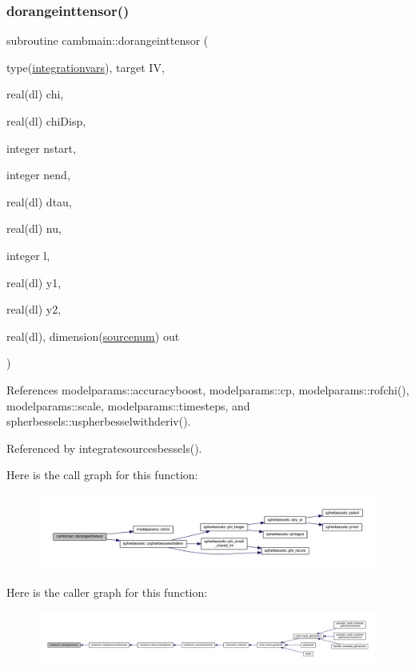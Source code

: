 \subsubsection{\texorpdfstring{dorangeinttensor()}{dorangeinttensor()}}
{\footnotesize\ttfamily subroutine cambmain\+::dorangeinttensor (\begin{DoxyParamCaption}\item[{type(\mbox{\hyperlink{structcambmain_1_1integrationvars}{integrationvars}}), target}]{IV,  }\item[{real(dl)}]{chi,  }\item[{real(dl)}]{chi\+Disp,  }\item[{integer}]{nstart,  }\item[{integer}]{nend,  }\item[{real(dl)}]{dtau,  }\item[{real(dl)}]{nu,  }\item[{integer}]{l,  }\item[{real(dl)}]{y1,  }\item[{real(dl)}]{y2,  }\item[{real(dl), dimension(\mbox{\hyperlink{namespacecambmain_a7874020426cc2db0dd79451dce8e4476}{sourcenum}})}]{out }\end{DoxyParamCaption})}



References modelparams\+::accuracyboost, modelparams\+::cp, modelparams\+::rofchi(), modelparams\+::scale, modelparams\+::timesteps, and spherbessels\+::uspherbesselwithderiv().



Referenced by integratesourcesbessels().

Here is the call graph for this function\+:
\nopagebreak
\begin{figure}[H]
\begin{center}
\leavevmode
\includegraphics[width=350pt]{namespacecambmain_af5113df414eaba3ff8913a737da72c34_cgraph}
\end{center}
\end{figure}
Here is the caller graph for this function\+:
\nopagebreak
\begin{figure}[H]
\begin{center}
\leavevmode
\includegraphics[width=350pt]{namespacecambmain_af5113df414eaba3ff8913a737da72c34_icgraph}
\end{center}
\end{figure}
\mbox{\label{namespacecambmain_a89b9b0f69a8f18b112b2309db4ad29c6}} 
